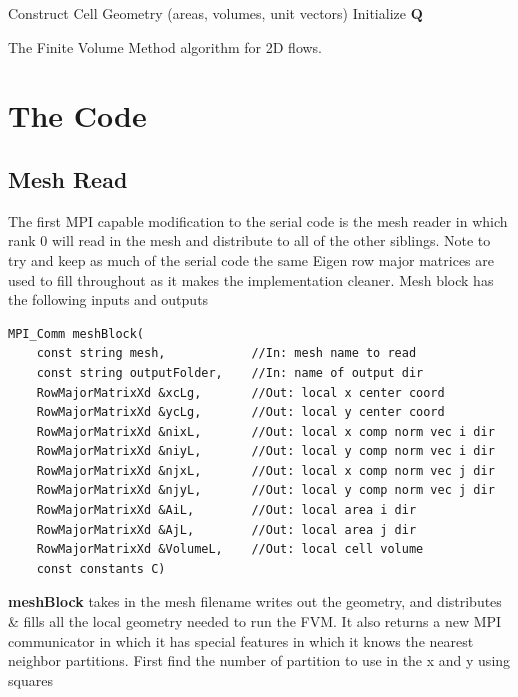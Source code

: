 \documentclass[paper=a4, fontsize=11pt]{scrartcl}
\numberwithin{equation}{section}                %
\numberwithin{figure}{section}                  %
\numberwithin{table}{section}                           %
\begin{document}
\begin{algorithm}[H]
  Construct Cell Geometry (areas, volumes, unit vectors)\;
  Initialize $\mathbf{Q}$\;
  \caption{The Finite Volume Method algorithm for 2D flows.}\label{fig:alg}
\end{algorithm}



\section{The Code}\label{sec:code}

\subsection{Mesh Read}

The first MPI capable modification to the serial code is the mesh reader in which rank 0 will read in the mesh and distribute to all of the other siblings. Note to try and keep as much of the serial code the same Eigen row major matrices are used to fill throughout as it makes the implementation cleaner. Mesh block has the following inputs and outputs

\begin{verbatim}
MPI_Comm meshBlock(
    const string mesh,            //In: mesh name to read
    const string outputFolder,    //In: name of output dir
    RowMajorMatrixXd &xcLg,       //Out: local x center coord
    RowMajorMatrixXd &ycLg,       //Out: local y center coord
    RowMajorMatrixXd &nixL,       //Out: local x comp norm vec i dir
    RowMajorMatrixXd &niyL,       //Out: local y comp norm vec i dir
    RowMajorMatrixXd &njxL,       //Out: local x comp norm vec j dir
    RowMajorMatrixXd &njyL,       //Out: local y comp norm vec j dir
    RowMajorMatrixXd &AiL,        //Out: local area i dir
    RowMajorMatrixXd &AjL,        //Out: local area j dir
    RowMajorMatrixXd &VolumeL,    //Out: local cell volume
    const constants C)                  
\end{verbatim}

\textbf{meshBlock} takes in the mesh filename writes out the geometry, and distributes \& fills all the local geometry needed to run the FVM. It also returns a new MPI communicator in which it has special features in which it knows the nearest neighbor partitions. First find the number of partition to use in the x and y using squares
\end{document}
